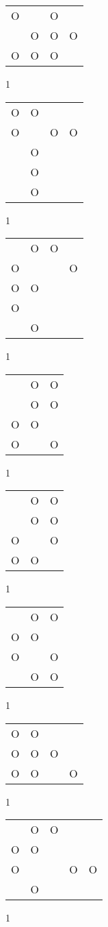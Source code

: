 \begin{tabular}{|m{0.2cm}m{0.2cm}m{0.2cm}m{0.2cm}|}\hline
O& &O& \\
 &O&O&O\\
O&O&O& \\
\hline\end{tabular}1
\begin{tabular}{|m{0.2cm}m{0.2cm}m{0.2cm}m{0.2cm}|}\hline
O&O& & \\
O& &O&O\\
 &O& & \\
 &O& & \\
 &O& & \\
\hline\end{tabular}1
\begin{tabular}{|m{0.2cm}m{0.2cm}m{0.2cm}m{0.2cm}|}\hline
 &O&O& \\
O& & &O\\
O&O& & \\
O& & & \\
 &O& & \\
\hline\end{tabular}1
\begin{tabular}{|m{0.2cm}m{0.2cm}m{0.2cm}|}\hline
 &O&O\\
 &O&O\\
O&O& \\
O& &O\\
\hline\end{tabular}1
\begin{tabular}{|m{0.2cm}m{0.2cm}m{0.2cm}|}\hline
 &O&O\\
 &O&O\\
O& &O\\
O&O& \\
\hline\end{tabular}1
\begin{tabular}{|m{0.2cm}m{0.2cm}m{0.2cm}|}\hline
 &O&O\\
O&O& \\
O& &O\\
 &O&O\\
\hline\end{tabular}1
\begin{tabular}{|m{0.2cm}m{0.2cm}m{0.2cm}m{0.2cm}|}\hline
O&O& & \\
O&O&O& \\
O&O& &O\\
\hline\end{tabular}1
\begin{tabular}{|m{0.2cm}m{0.2cm}m{0.2cm}m{0.2cm}m{0.2cm}|}\hline
 &O&O& & \\
O&O& & & \\
O& & &O&O\\
 &O& & & \\
\hline\end{tabular}1
